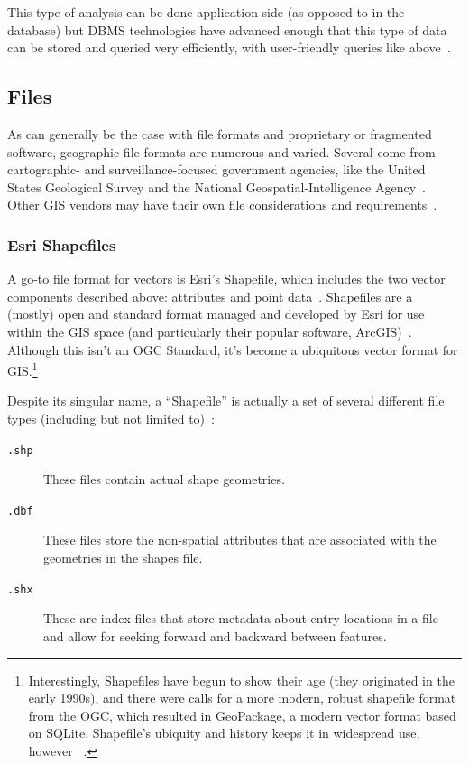 This type of analysis can be done application-side (as opposed to in the database) but DBMS technologies have advanced enough that this type of data can be stored and queried very efficiently, with user-friendly queries like above~\cite{Boundless}.

\subsection{Files}
\label{background_formats}
As can generally be the case with file formats and proprietary or fragmented software, geographic file formats are numerous and varied. Several come from cartographic- and surveillance-focused government agencies, like the United States Geological Survey and the National Geospatial-Intelligence Agency~\cite{UsgsStandards}. Other GIS vendors may have their own file considerations and requirements~\cite{slashgeo,Environ1998,GeoJSON}.

\subsubsection{Esri Shapefiles}
A go-to file format for vectors is Esri's Shapefile, which includes the two vector components described above: attributes and point data~\cite{Environ1998}. Shapefiles are a (mostly) open and standard format managed and developed by Esri for use within the GIS space (and particularly their popular software, ArcGIS)~\cite{Environ1998}. Although this isn't an OGC Standard, it's become a ubiquitous vector format for GIS.\footnote{Interestingly, Shapefiles have begun to show their age (they originated in the early 1990s), and there were calls for a more modern, robust shapefile format from the OGC, which resulted in GeoPackage, a modern vector format based on SQLite. Shapefile's ubiquity and history keeps it in widespread use, however ~\cite{slashgeo,GeoPackage}.}

Despite its singular name, a ``Shapefile'' is actually a set of several different file types (including but not limited to)~\cite{Environ1998}:

\begin{description}
  \item[\tt{.shp}] These files contain actual shape geometries.
  \item[\tt{.dbf}] These files store the non-spatial attributes that are associated with the geometries in the shapes file.
  \item[\tt{.shx}] These are index files that store metadata about entry locations in a file and allow for seeking forward and backward between features.
\end{description}

